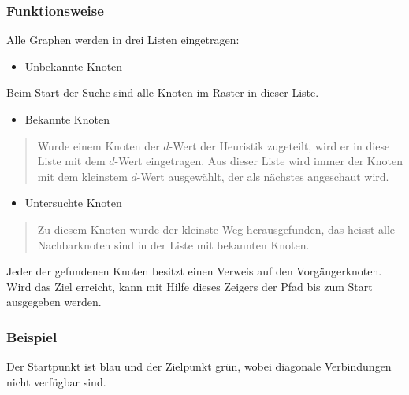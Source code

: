 \subsubsection{Funktionsweise}

Alle Graphen werden in drei Listen eingetragen:

\begin{itemize}
\item Unbekannte Knoten
\end{itemize}

Beim Start der Suche sind alle Knoten im Raster in dieser Liste.

\begin{itemize}
\item Bekannte Knoten
\end{itemize}

\begin{quote}
Wurde einem Knoten der $d$-Wert der Heuristik zugeteilt, wird er in diese
Liste mit dem $d$-Wert eingetragen. Aus dieser Liste wird immer der Knoten
mit dem kleinstem $d$-Wert ausgewählt, der als nächstes angeschaut wird.
\end{quote}

\begin{itemize}
\item Untersuchte Knoten
\end{itemize}

\begin{quote}
Zu diesem Knoten wurde der kleinste Weg herausgefunden, das heisst alle
Nachbarknoten sind in der Liste mit bekannten Knoten.
\end{quote}

Jeder der gefundenen Knoten besitzt einen Verweis auf den
Vorgängerknoten. Wird das Ziel erreicht, kann mit Hilfe dieses Zeigers
der Pfad bis zum Start ausgegeben werden.
\cite[Schmidt, Fuchs]{asterngeo}

\subsubsection{Beispiel}

Der Startpunkt ist blau und der Zielpunkt grün, wobei diagonale Verbindungen nicht verfügbar sind.


